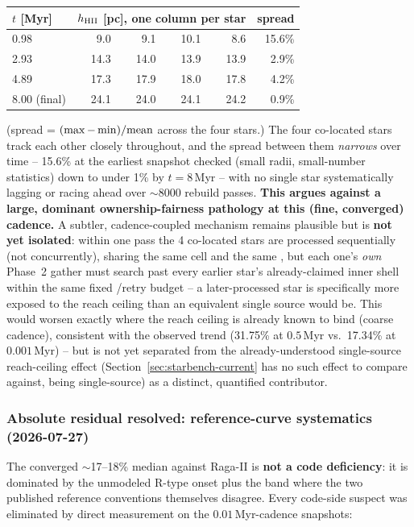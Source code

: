 \begin{center}
\begin{tabular}{lrrrrr}
\hline
$t$ [Myr] & \multicolumn{4}{c}{$h_{\rm HII}$ [pc], one column per star} & spread \\
\hline
0.98 & 9.0 & 9.1 & 10.1 & 8.6 & 15.6\% \\
2.93 & 14.3 & 14.0 & 13.9 & 13.9 & 2.9\% \\
4.89 & 17.3 & 17.9 & 18.0 & 17.8 & 4.2\% \\
8.00 (final) & 24.1 & 24.0 & 24.1 & 24.2 & 0.9\% \\
\hline
\end{tabular}
\end{center}
(spread = $(\max-\min)/{\rm mean}$ across the four stars.) The four
co-located stars track each other closely throughout, and the spread
between them \emph{narrows} over time -- 15.6\% at the earliest
snapshot checked (small radii, small-number statistics) down to under
1\% by $t=8\,$Myr -- with no single star systematically lagging or
racing ahead over $\sim$8000 rebuild passes. \textbf{This argues against a
large, dominant ownership-fairness pathology at this (fine, converged)
cadence.} A subtler, cadence-coupled mechanism remains plausible but is
\textbf{not yet isolated}: within one pass the 4 co-located stars are
processed sequentially (not concurrently), sharing the same cell and
the same , but each one's \emph{own} Phase~2
gather must search past every earlier star's already-claimed inner
shell within the same fixed /retry budget --
a later-processed star is specifically more exposed to the reach
ceiling than an equivalent single source would be. This would worsen
exactly where the reach ceiling is already known to bind (coarse
cadence), consistent with the observed trend (31.75\% at $0.5\,$Myr
vs.\ 17.34\% at $0.001\,$Myr) -- but is not yet separated from the
already-understood single-source reach-ceiling effect
(Section~\ref{sec:starbench-current} has no such effect to compare
against, being single-source) as a distinct, quantified contributor.

\subsubsection{Absolute residual resolved: reference-curve systematics
  (2026-07-27)}
\label{sec:husmith-resolution}

The converged $\sim$17--18\% median against Raga-II is \textbf{not a
code deficiency}: it is dominated by the unmodeled R-type onset plus
the band where the two published reference conventions themselves
disagree. Every code-side suspect was eliminated by direct measurement
on the $0.01\,$Myr-cadence snapshots:

